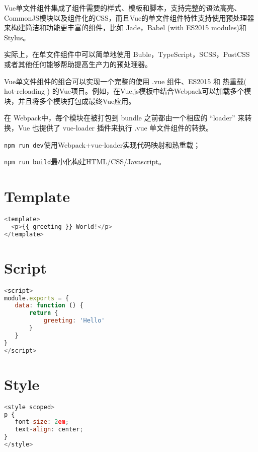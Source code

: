 Vue单文件组件集成了组件需要的样式、模板和脚本，支持完整的语法高亮、CommonJS模块以及组件化的CSS，而且Vue的单文件组件特性支持使用预处理器来构建简洁和功能更丰富的组件，比如 Jade，Babel (with ES2015 modules)和 Stylus。

实际上，在单文件组件中可以简单地使用 Buble，TypeScript，SCSS，PostCSS 或者其他任何能够帮助提高生产力的预处理器。

Vue单文件组件的组合可以实现一个完整的使用 .vue 组件、ES2015 和 热重载( hot-reloading ) 的Vue项目。例如，在Vue.js模板中结合Webpack可以加载多个模块，并且将多个模块打包成最终Vue应用。



在 Webpack中，每个模块在被打包到 bundle 之前都由一个相应的 “loader” 来转换，Vue 也提供了 vue-loader 插件来执行 .vue 单文件组件的转换。

\begin{compactitem}
\item \texttt{npm run dev}使用Webpack+vue-loader实现代码映射和热重载；
\item \texttt{npm run build}最小化构建HTML/CSS/Javascript。
\end{compactitem}



\section{Template}



\begin{lstlisting}[language=JavaScript]
<template>
  <p>{{ greeting }} World!</p>
</template>
\end{lstlisting}


\section{Script}


\begin{lstlisting}[language=JavaScript]
<script>
module.exports = {
   data: function () {
       return {
           greeting: 'Hello'
       }
   }
}
</script>
\end{lstlisting}

\section{Style}



\begin{lstlisting}[language=JavaScript]
<style scoped>
p {
   font-size: 2em;
   text-align: center;
}
</style>
\end{lstlisting}


